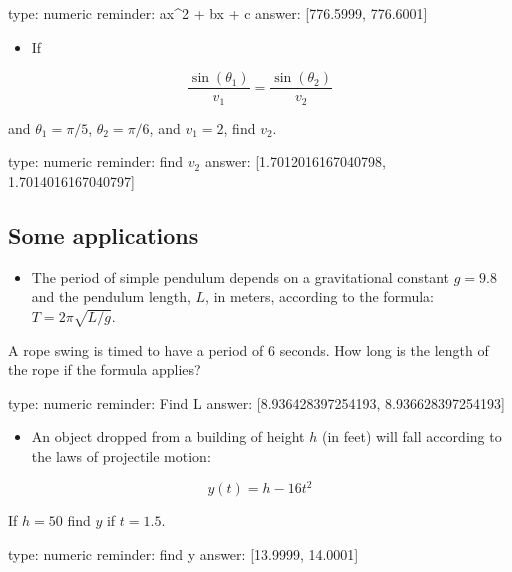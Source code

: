 \documentclass[12pt]{article}
\begin{document}
\begin{answer}
    type: numeric
    reminder: ax^2 + bx + c
    answer: [776.5999, 776.6001]

\end{answer}

\begin{itemize}
\itemsep1pt\parskip0pt
\item
  If
\end{itemize}

\[
\frac{\sin(\theta_1)}{v_1} = \frac{\sin(\theta_2)}{v_2}
\]

and $\theta_1 = \pi/5$, $\theta_2 = \pi/6$, and $v_1=2$, find $v_2$.

\begin{answer}
    type: numeric
    reminder: find \(v_2\)
    answer: [1.7012016167040798, 1.7014016167040797]

\end{answer}

\subsection{Some applications}

\begin{itemize}
\itemsep1pt\parskip0pt
\item
  The period of simple pendulum depends on a gravitational constant
  $g=9.8$ and the pendulum length, $L$, in meters, according to the
  formula: $T=2\pi\sqrt{L/g}$.
\end{itemize}

A rope swing is timed to have a period of $6$ seconds. How long is the
length of the rope if the formula applies?

\begin{answer}
    type: numeric
    reminder: Find L
    answer: [8.936428397254193, 8.936628397254193]

\end{answer}

\begin{itemize}
\itemsep1pt\parskip0pt
\item
  An object dropped from a building of height $h$ (in feet) will fall
  according to the laws of projectile motion:
\end{itemize}

\[
y(t) = h - 16t^2
\]

If $h=50$ find $y$ if $t=1.5$.

\begin{answer}
    type: numeric
    reminder: find y
    answer: [13.9999, 14.0001]

\end{answer}
\end{document}
